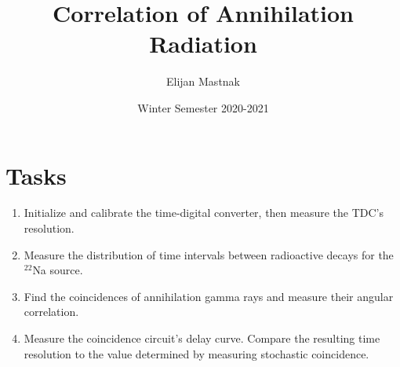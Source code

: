 \documentclass[11pt, a4paper]{article}
\newcommand{\isoptope}[2]{${}^{#2}${#1}}
\begin{document}
\title{Correlation of Annihilation Radiation}
\author{Elijan Mastnak}
\date{Winter Semester 2020-2021}
\maketitle
\tableofcontents
\newpage
		

\section{Tasks}
\begin{enumerate}

	\item Initialize and calibrate the time-digital converter, then measure the TDC's resolution.
	
	\item Measure the distribution of time intervals between radioactive decays for the \isoptope{Na}{22} source. 
	
	\item Find the coincidences of annihilation gamma rays and measure their angular correlation.
	
	\item Measure the coincidence circuit's delay curve. Compare the resulting time resolution to the value determined by measuring stochastic coincidence.
	
\end{enumerate}
\end{document}
